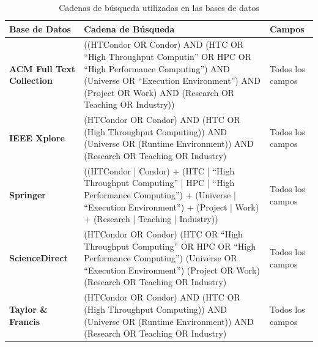 \begin{table}[htbp]
	\centering
	\caption{Cadenas de búsqueda utilizadas en las bases de datos}
	\label{table:cadenas_de_busqueda}
	\renewcommand{\arraystretch}{1}  %
	\begin{tabular}{p{3.2cm}p{11cm}p{2.5cm}}
		\toprule
		\textbf{Base de Datos}            & \textbf{Cadena de Búsqueda}                                                                                                                                                                                        & \textbf{Campos}  \\
		\midrule
		\textbf{ACM Full Text Collection} & ((HTCondor OR Condor) AND (HTC OR ``High Throughput Computin'' OR HPC OR ``High Performance Computing'') AND (Universe OR ``Execution Environment'') AND (Project OR Work) AND (Research OR Teaching OR Industry)) & Todos los campos \\
		\addlinespace[0.8em]
		\textbf{IEEE Xplore}              & (HTCondor OR Condor) AND (HTC OR (High Throughput Computing)) AND (Universe OR (Runtime Environment)) AND (Research OR Teaching OR Industry)                                                                       & Todos los campos \\
		\addlinespace[0.8em]
		\textbf{Springer}                 & ((HTCondor | Condor) + (HTC | ``High Throughput Computing'' | HPC | ``High Performance Computing'') + (Universe | ``Execution Environment'') + (Project | Work) + (Research | Teaching | Industry))                & Todos los campos \\
		\addlinespace[0.8em]
		\textbf{ScienceDirect}            & (HTCondor OR Condor) (HTC OR ``High Throughput Computing'' OR HPC OR ``High Performance Computing'') (Universe OR ``Execution Environment'') (Project OR Work) (Research OR Teaching OR Industry)                  & Todos los campos \\
		\addlinespace[0.8em]
		\textbf{Taylor \& Francis}        & (HTCondor OR Condor) AND (HTC OR (High Throughput Computing)) AND (Universe OR (Runtime Environment)) AND (Research OR Teaching OR Industry)                                                                       & Todos los campos \\
		\bottomrule
	\end{tabular}
\end{table}





